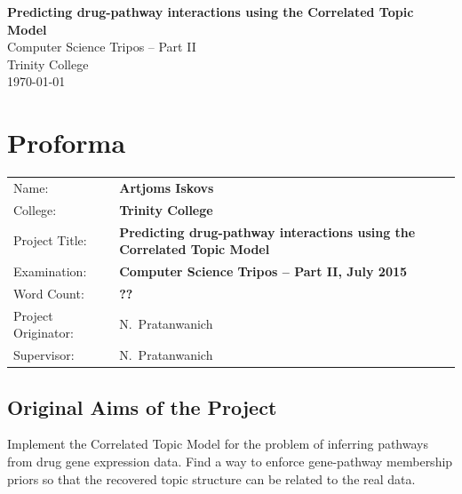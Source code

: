 \documentclass[12pt,a4paper,twoside,openright]{report}
\begin{document}





\pagestyle{empty}


\vspace*{60mm}
\begin{center}
\Huge
\textbf{Predicting drug-pathway interactions using the Correlated Topic Model} \\[5mm]
Computer Science Tripos -- Part II \\[5mm]
Trinity College \\[5mm]
\today  %
\end{center}


\pagestyle{plain}

\chapter*{Proforma}

{\large
\begin{tabular}{ll}
Name:               & \bf Artjoms Iskovs                       \\
College:            & \bf Trinity College                     \\
Project Title:     & \bf Predicting drug-pathway interactions using the Correlated Topic Model\\
Examination:        & \bf Computer Science Tripos -- Part II, July 2015  \\
Word Count:         & \bf ??\\
Project Originator: & N.~Pratanwanich                    \\
Supervisor:         & N.~Pratanwanich                    \\ 
\end{tabular}
}

\section*{Original Aims of the Project}
Implement the Correlated Topic Model for the problem of inferring pathways from drug gene expression data. Find a way to enforce gene-pathway membership priors so that the recovered topic structure can be related to the real data.
\end{document}
